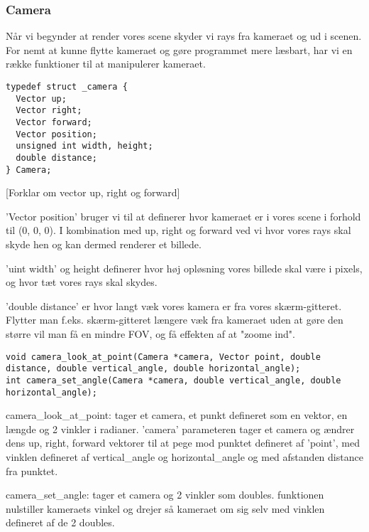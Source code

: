 \subsubsection{Camera}
Når vi begynder at render vores scene skyder vi rays fra kameraet og ud i scenen. For nemt at kunne flytte kameraet og gøre programmet mere læsbart, har vi en række funktioner til at manipulerer kameraet.

\begin{lstlisting}[style=Cstyle, caption=Definition af Camera struct ]
typedef struct _camera {
  Vector up;
  Vector right;
  Vector forward;
  Vector position;
  unsigned int width, height;
  double distance;
} Camera;
\end{lstlisting}

[Forklar om vector up, right og forward]

'Vector position' bruger vi til at definerer hvor kameraet er i vores scene i forhold til (0, 0, 0). I kombination med up, right og forward ved vi hvor vores rays skal skyde hen og kan dermed renderer et billede.

'uint width' og height definerer hvor høj opløsning vores billede skal være i pixels, og hvor tæt vores rays skal skydes.

'double distance' er hvor langt væk vores kamera er fra vores skærm-gitteret. Flytter man f.eks. skærm-gitteret længere væk fra kameraet uden at gøre den større vil man få en mindre FOV\cite{fov}, og få effekten af at "zoome ind".

\begin{lstlisting}[style=Cstyle, caption=Prototyper for funktioner der manipulerer camera-structen]
void camera_look_at_point(Camera *camera, Vector point, double distance, double vertical_angle, double horizontal_angle);
int camera_set_angle(Camera *camera, double vertical_angle, double horizontal_angle);
\end{lstlisting}

camera\_look\_at\_point: tager et camera, et punkt defineret som en vektor, en længde og 2 vinkler i radianer. 'camera' parameteren tager et camera og ændrer dens up, right, forward vektorer til at pege mod punktet defineret af 'point', med vinklen defineret af vertical_angle og horizontal_angle og med afstanden distance fra punktet.

camera\_set\_angle: tager et camera og 2 vinkler som doubles. funktionen nulstiller kameraets vinkel og drejer så kameraet om sig selv med vinklen defineret af de 2 doubles.